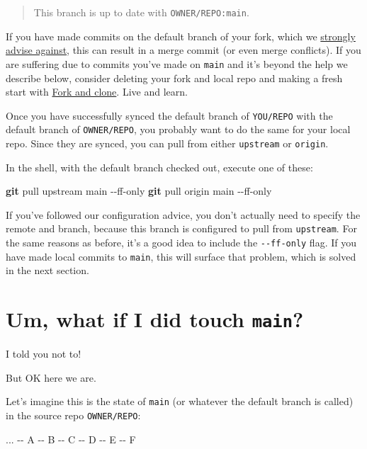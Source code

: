 \documentclass[
]{book}
\newenvironment{Shaded}{\begin{snugshade}}{\end{snugshade}}
\newcommand{\AttributeTok}[1]{\textcolor[rgb]{0.13,0.29,0.53}{#1}}
\newcommand{\ExtensionTok}[1]{#1}
\newcommand{\FunctionTok}[1]{\textcolor[rgb]{0.13,0.29,0.53}{\textbf{#1}}}
\newcommand{\NormalTok}[1]{#1}
\begin{document}
\begin{quote}
This branch is up to date with \texttt{OWNER/REPO:main}.
\end{quote}

If you have made commits on the default branch of your fork, which we \hyperref[fork-dont-touch-main]{strongly advise against}, this can result in a merge commit (or even merge conflicts).
If you are suffering due to commits you've made on \texttt{main} and it's beyond the help we describe below, consider deleting your fork and local repo and making a fresh start with \href{fork-and-clone}{Fork and clone}.
Live and learn.

Once you have successfully synced the default branch of \texttt{YOU/REPO} with the default branch of \texttt{OWNER/REPO}, you probably want to do the same for your local repo.
Since they are synced, you can pull from either \texttt{upstream} or \texttt{origin}.

In the shell, with the default branch checked out, execute one of these:

\begin{Shaded}
\begin{Highlighting}[]
\FunctionTok{git}\NormalTok{ pull upstream main }\AttributeTok{{-}{-}ff{-}only}
\FunctionTok{git}\NormalTok{ pull origin main }\AttributeTok{{-}{-}ff{-}only}
\end{Highlighting}
\end{Shaded}

If you've followed our configuration advice, you don't actually need to specify the remote and branch, because this branch is configured to pull from \texttt{upstream}.
For the same reasons as before, it's a good idea to include the \texttt{-\/-ff-only} flag.
If you have made local commits to \texttt{main}, this will surface that problem, which is solved in the next section.

\section{\texorpdfstring{Um, what if I did touch \texttt{main}?}{Um, what if I did touch main?}}\label{touched-main}

I told you not to!

But OK here we are.

Let's imagine this is the state of \texttt{main} (or whatever the default branch is called) in the source repo \texttt{OWNER/REPO}:

\begin{Shaded}
\begin{Highlighting}[]
\ExtensionTok{...} \AttributeTok{{-}{-}}\NormalTok{ A }\AttributeTok{{-}{-}}\NormalTok{ B }\AttributeTok{{-}{-}}\NormalTok{ C }\AttributeTok{{-}{-}}\NormalTok{ D }\AttributeTok{{-}{-}}\NormalTok{ E }\AttributeTok{{-}{-}}\NormalTok{ F}
\end{Highlighting}
\end{Shaded}
\end{document}
